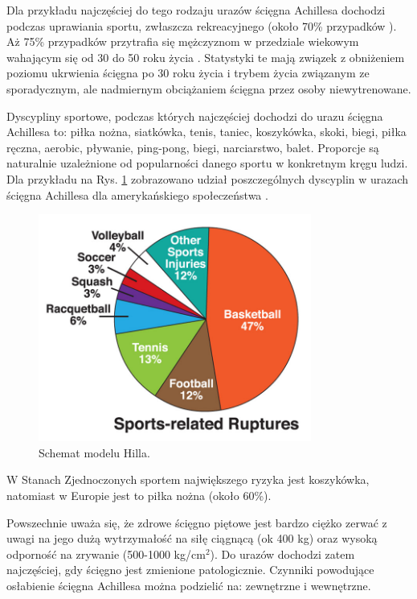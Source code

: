 Dla przykładu najczęściej do tego rodzaju urazów ścięgna Achillesa dochodzi podczas uprawiania sportu, zwłaszcza rekreacyjnego (około 70\% przypadków \cite{EpidemiologyUS, Etiologia}). Aż 75\% przypadków przytrafia się mężczyznom w przedziale wiekowym wahającym się od 30 do 50 roku życia \cite{Etiologia}. Statystyki te mają związek z obniżeniem poziomu ukrwienia ścięgna po 30 roku życia i trybem życia związanym ze sporadycznym, ale nadmiernym obciążaniem ścięgna przez osoby niewytrenowane. 

Dyscypliny sportowe, podczas których najczęściej dochodzi do urazu ścięgna Achillesa to: piłka nożna, siatkówka, tenis, taniec, koszykówka, skoki, biegi, piłka ręczna, aerobic, pływanie, ping-pong, biegi, narciarstwo, balet. Proporcje są naturalnie uzależnione od popularności danego sportu w konkretnym kręgu ludzi. Dla przykładu na Rys. \ref{rupture} zobrazowano udział poszczególnych dyscyplin w urazach ścięgna Achillesa dla amerykańskiego społeczeństwa \cite{EpidemiologyUS}. 

\begin{figure}[h!]
	\centering
	\includegraphics[width=0.8\textwidth]{figures/Achilles_zerwanie.jpg}
	\caption{Schemat modelu Hilla.}
	\label{rupture}
\end{figure}

W Stanach Zjednoczonych sportem największego ryzyka jest koszykówka, natomiast w Europie jest to piłka nożna (około 60\%).  

Powszechnie uważa się, że zdrowe ścięgno piętowe jest bardzo ciężko zerwać z uwagi na jego dużą wytrzymałość na siłę ciągnącą (ok 400 kg) oraz wysoką odporność na zrywanie (500-1000 kg/cm$^2$). Do urazów dochodzi zatem najczęściej, gdy ścięgno jest zmienione patologicznie. Czynniki powodujące osłabienie ścięgna Achillesa można podzielić na: zewnętrzne i wewnętrzne.

